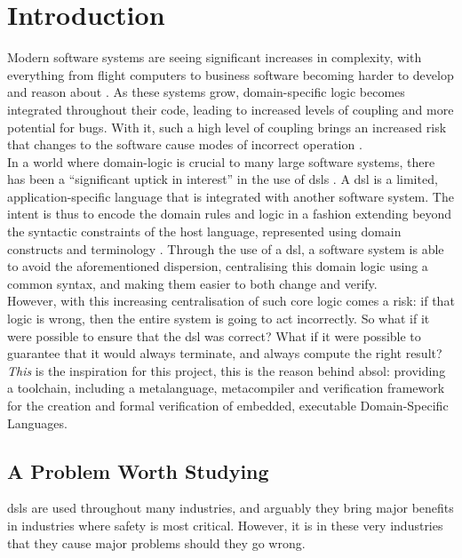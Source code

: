 \chapter{Introduction} %
\label{cha:introduction}
Modern software systems are seeing significant increases in complexity, with everything from flight computers to business software becoming harder to develop and reason about \citep{dvorak2009nasa}.
As these systems grow, domain-specific logic becomes integrated throughout their code, leading to increased levels of coupling and more potential for bugs.
With it, such a high level of coupling brings an increased risk that changes to the software cause modes of incorrect operation \citep{khawar2001developing}.\\

In a world where domain-logic is crucial to many large software systems, there has been a ``significant uptick in interest'' in the use of \glspl{dsl} \citep{fowler2010domain}.
A \gls{dsl} is a limited, application-specific language that is integrated with another software system.
The intent is thus to encode the domain rules and logic in a fashion extending beyond the syntactic constraints of the host language, represented using domain constructs and terminology \citep{Mernik:2005:DDL:1118890.1118892}.
Through the use of a \gls{dsl}, a software system is able to avoid the aforementioned dispersion, centralising this domain logic using a common syntax, and making them easier to both change and verify.\\

However, with this increasing centralisation of such core logic comes a risk: if that logic is wrong, then the entire system is going to act incorrectly.
So what if it were possible to ensure that the \gls{dsl} was correct?
What if it were possible to guarantee that it would always terminate, and always compute the right result?
\textit{This} is the inspiration for this project, this is the reason behind \gls{absol}: providing a toolchain, including a \gls{metalanguage}, \gls{metacompiler} and verification framework for the creation and formal verification of embedded, executable Domain-Specific Languages.

\section{A Problem Worth Studying} %
\label{sec:a_problem_worth_studying}
\glspl{dsl} are used throughout many industries, and arguably they bring major benefits in industries where safety is most critical.
However, it is in these very industries that they cause major problems should they go wrong.\\

